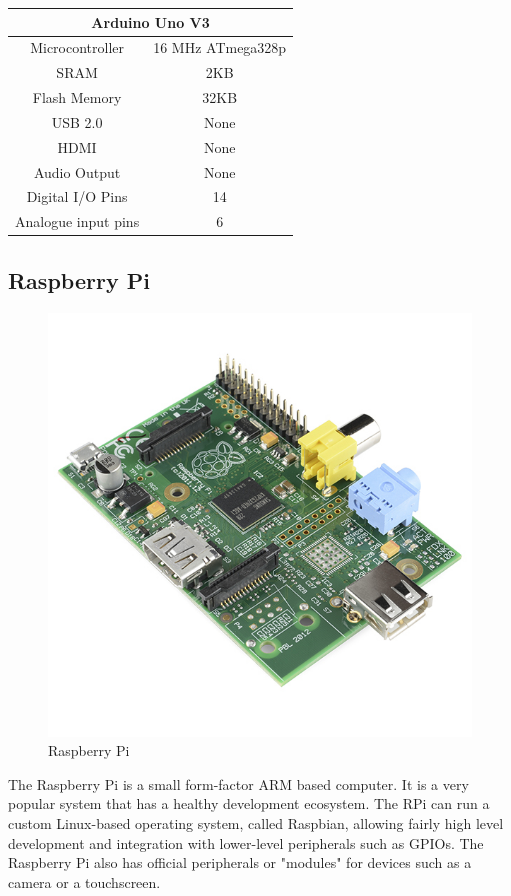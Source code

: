 \documentclass[10pt]{article}
\begin{document}
\begin{center}
	\begin{tabular}{ | c | c | }
		\hline
	 	\multicolumn{2}{|c|}{Arduino Uno V3} \\ \hline
		Microcontroller 	& 16 MHz ATmega328p \\ \hline
		SRAM 			& 2KB \\ \hline
		Flash Memory	& 32KB \\ \hline
		USB 2.0		& None \\ \hline
		HDMI 			& None \\ \hline
		Audio Output	& None \\ \hline
		Digital I/O Pins	& 14 \\ \hline
		Analogue input pins & 6 \\ \hline
	\end{tabular}
\end{center}

\subsection{Raspberry Pi}

\begin{figure}[h]
\centering
\caption{Raspberry Pi}
\label{Raspberry Pi}
\includegraphics[scale=.5]{images/Raspberry-Pi.jpg}
\end{figure}
The Raspberry Pi is a small form-factor ARM based computer. It is a very popular system that has a healthy development ecosystem. The RPi can run a custom Linux-based operating system, called Raspbian, allowing fairly high level development and integration with lower-level peripherals such as GPIOs. The Raspberry Pi also has official peripherals or "modules" for devices such as a camera or a touchscreen.
\end{document}
